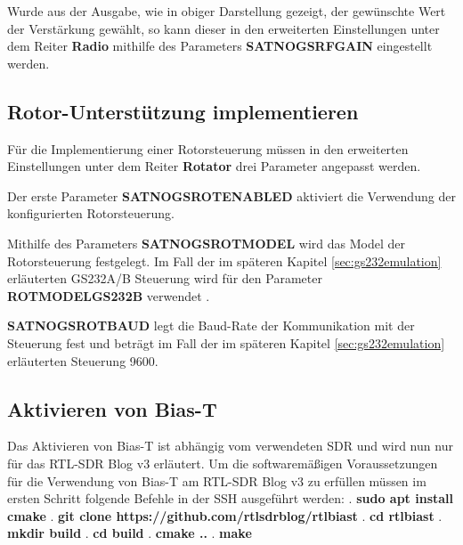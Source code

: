 Wurde aus der Ausgabe, wie in obiger Darstellung gezeigt, der gewünschte Wert der Verstärkung gewählt, so kann dieser in den erweiterten Einstellungen unter dem Reiter \textbf{Radio} mithilfe des Parameters \textbf{SATNOGS\textunderscore RF\textunderscore GAIN} eingestellt werden. 

\subsection{Rotor-Unterstützung implementieren}
Für die Implementierung einer Rotorsteuerung müssen in den erweiterten Einstellungen unter dem Reiter \textbf{Rotator} drei Parameter angepasst werden. 

Der erste Parameter \textbf{SATNOGS\textunderscore ROT\textunderscore ENABLED} aktiviert die Verwendung der konfigurierten Rotorsteuerung. 

Mithilfe des Parameters \textbf{SATNOGS\textunderscore ROT\textunderscore MODEL} wird das Model der Rotorsteuerung festgelegt. Im Fall der im späteren Kapitel \ref{sec:gs232emulation} erläuterten GS232A/B Steuerung wird für den Parameter \textbf{ROT\textunderscore MODEL\textunderscore GS232B} verwendet \cite{noauthor_satnogsclient_nodate}. 

\textbf{SATNOGS\textunderscore ROT\textunderscore BAUD} legt die Baud-Rate der Kommunikation mit der Steuerung fest und beträgt im Fall der im späteren Kapitel \ref{sec:gs232emulation} erläuterten Steuerung 9600.

\subsection{Aktivieren von Bias-T}
Das Aktivieren von Bias-T ist abhängig vom verwendeten SDR und wird nun nur für das RTL-SDR Blog v3 erläutert. Um die softwaremäßigen Voraussetzungen für die Verwendung von Bias-T am RTL-SDR Blog v3 zu erfüllen müssen im ersten Schritt folgende Befehle in der SSH ausgeführt werden:
. \textbf{sudo apt install cmake}
. \textbf{git clone https://github.com/rtlsdrblog/rtl\textunderscore biast}
. \textbf{cd rtl\textunderscore biast}
. \textbf{mkdir build}
. \textbf{cd build}
. \textbf{cmake ..}
. \textbf{make}

